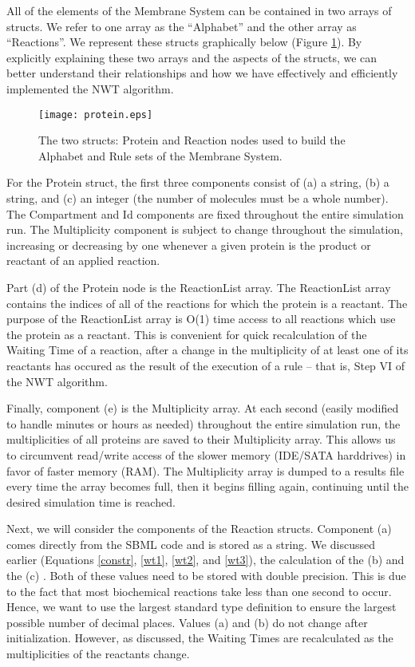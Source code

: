 \documentclass[copyright]{eptcs}
\begin{document}
All of the elements of the Membrane System can be contained in two arrays of structs.  We refer to one array as the ``Alphabet'' and the other array as ``Reactions''.  We represent these structs graphically below (Figure \ref{thestructs}).  By explicitly explaining these two arrays and the aspects of the structs, we can better understand their relationships and how we have effectively and efficiently implemented the NWT algorithm.

\begin{figure}[ht]
\centering
\texttt{[image: protein.eps]}
\caption{The two structs: Protein and Reaction nodes used to build the Alphabet and Rule sets of the Membrane System.}
\label{thestructs}
\end{figure}

For the Protein struct, the first three components consist of (a) a string, (b) a string, and (c) an integer (the number of molecules must be a whole number).  The Compartment and Id components are fixed throughout the entire simulation run.  The Multiplicity component is subject to change throughout the simulation, increasing or decreasing by one whenever a given protein is the product or reactant of an applied reaction.

Part (d) of the Protein node is the ReactionList array.  The ReactionList array contains the indices of all of the reactions for which the protein is a reactant.  The purpose of the ReactionList array is O(1) time access to all reactions which use the protein as a reactant.  This is convenient for quick recalculation of the Waiting Time of a reaction, after a change in the multiplicity of at least one of its reactants has occured as the result of the execution of a rule -- that is, Step VI of the NWT algorithm.


Finally, component (e) is the Multiplicity array.  At each second (easily modified to handle minutes or hours as needed) throughout the entire simulation run, the multiplicities of all proteins are saved to their Multiplicity array.  This allows us to circumvent read/write access of the slower memory (IDE/SATA harddrives) in favor of faster memory (RAM).  The Multiplicity array is dumped to a results file every time the array becomes full, then it begins filling again, continuing until the desired simulation time is reached.


Next, we will consider the components of the Reaction structs. Component (a) comes directly from the SBML code and is stored as a string.  We discussed earlier (Equations \ref{constr}, \ref{wt1}, \ref{wt2}, and \ref{wt3}), the calculation of the (b)  and the (c) .  Both of these values need to be stored with double precision.  This is due to the fact that most biochemical reactions take less than one second to occur.  Hence, we want to use the largest standard type definition to ensure the largest possible number of decimal places.  Values (a) and (b) do not change after initialization.  However, as discussed, the Waiting Times are recalculated as the multiplicities of the reactants change.
\end{document}

